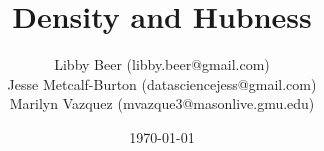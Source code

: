 \documentclass{beamer}
\title[Hubness]{Density and Hubness} %
\author[Density/Clustering]{Libby Beer (libby.beer@gmail.com)\\
Jesse Metcalf-Burton (datasciencejess@gmail.com)\\
Marilyn Vazquez (mvazque3@masonlive.gmu.edu)} %
\date{\today} %
\begin{document}
\begin{frame}
\titlepage %
\end{frame}








\end{document}
